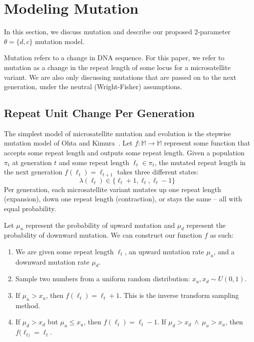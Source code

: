 \section{Modeling Mutation}\label{sec:mm}
In this section, we discuss mutation and describe our proposed 2-parameter $\theta = \{ d, c\}$ mutation model.

Mutation refers to a change in DNA sequence.
For this paper, we refer to mutation as a change in the repeat length of some locus for a microsatellite variant.
We are also only discussing mutations that are passed on to the next generation, under the neutral (Wright-Fisher)
assumptions.

\subsection{Repeat Unit Change Per Generation}\label{subsec:rucpg}
The simplest model of microsatellite mutation and evolution is the stepwise mutation
model of Ohta and Kimura~\cite{ohtaModelMutationAppropriate2007}.
Let $f : \mathbb{M} \rightarrow \mathbb{M}$ represent some function that accepts some repeat length and outputs some
repeat length.
Given a population $\pi_t$ at generation $t$ and some repeat length $\ell_t \in \pi_t$, the mutated repeat length
in the next generation $f(\ell_{t}) = \ell_{t+1}$ takes three different states:
\begin{equation}
    \lambda(\ell_t) \in \{ \ell_t + 1 , \ell_t, \ell_t - 1\}
\end{equation}
Per generation, each microsatellite variant mutates up one repeat length (expansion), down one repeat length
(contraction), or stays the same -- all with equal probability.

Let $\mu_u$ represent the probability of upward mutation and $\mu_d$ represent the probability of downward mutation.
We can construct our function $f$ as such:
\begin{enumerate}
    \item We are given some repeat length $\ell_t$, an upward mutation rate $\mu_u$, and a
        downward mutation rate $\mu_d$.
    \item Sample two numbers from a uniform random distribution: $x_u, x_d \sim U(0, 1)$.
    \item If $\mu_u > x_u$, then $f(\ell_{t}) = \ell_t + 1$.
        This is the inverse transform sampling method. \label{enum:um}
    \item If $\mu_d > x_d$ but $\mu_u \leq x_u$, then $f(\ell_{t}) = \ell_t - 1$. \label{enum:dm}
        If $\mu_d > x_d \ \land \ \mu_u > x_u$, then $f(\ell_{t)} = \ell_{t}$.
\end{enumerate}

